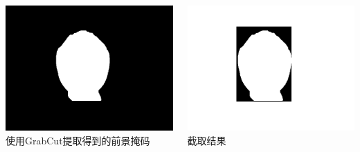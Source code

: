 \documentclass[xcolor=svgnames,serif,table]{beamer}
\begin{document}
\begin{frame}
  \medskip
  
  \begin{columns}
    \raggedleft
    \begin{minipage}{0.7\linewidth}
      \centering
      \includegraphics[width=\textwidth]{grabcut-mask.png}\\
      使用GrabCut提取得到的前景掩码
    \end{minipage}
    \begin{minipage}{0.7\linewidth}
      \centering
      \includegraphics[width=\textwidth]{grabcut-roi.png}\\
      截取结果
    \end{minipage}
  \end{columns}
\end{frame}
\end{document}

